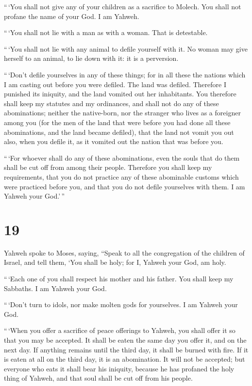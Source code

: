  ``\,`You shall not give any of your children as a
sacrifice to Molech. You shall not profane the name of your God. I am
Yahweh.

 ``\,`You shall not lie with a man as with a woman. That is
detestable.

 ``\,`You shall not lie with any animal to defile yourself
with it. No woman may give herself to an animal, to lie down with it: it
is a perversion.

 ``\,`Don't defile yourselves in any of these things; for
in all these the nations which I am casting out before you were defiled.
 The land was defiled. Therefore I punished its iniquity,
and the land vomited out her inhabitants.  You therefore
shall keep my statutes and my ordinances, and shall not do any of these
abominations; neither the native-born, nor the stranger who lives as a
foreigner among you  (for the men of the land that were
before you had done all these abominations, and the land became
defiled),  that the land not vomit you out also, when you
defile it, as it vomited out the nation that was before you.

 ``\,`For whoever shall do any of these abominations, even
the souls that do them shall be cut off from among their people.
 Therefore you shall keep my requirements, that you do not
practice any of these abominable customs which were practiced before
you, and that you do not defile yourselves with them. I am Yahweh your
God.'\,''

\hypertarget{section-18}{%
\section{19}\label{section-18}}

 Yahweh spoke to Moses, saying,  ``Speak to all
the congregation of the children of Israel, and tell them, `You shall be
holy; for I, Yahweh your God, am holy.

 ``\,`Each one of you shall respect his mother and his
father. You shall keep my Sabbaths. I am Yahweh your God.

 ``\,`Don't turn to idols, nor make molten gods for
yourselves. I am Yahweh your God.

 ``\,`When you offer a sacrifice of peace offerings to
Yahweh, you shall offer it so that you may be accepted.  It
shall be eaten the same day you offer it, and on the next day. If
anything remains until the third day, it shall be burned with fire.
 If it is eaten at all on the third day, it is an
abomination. It will not be accepted;  but everyone who eats
it shall bear his iniquity, because he has profaned the holy thing of
Yahweh, and that soul shall be cut off from his people.

